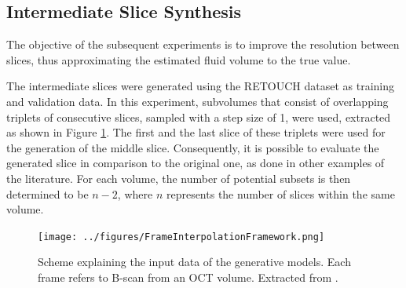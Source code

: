 \subsection{Intermediate Slice Synthesis}
The objective of the subsequent experiments is to improve the resolution between slices, thus approximating the estimated fluid volume to the true value.
\par
The intermediate slices were generated using the RETOUCH dataset as training and validation data. In this experiment, subvolumes that consist of overlapping triplets of consecutive slices, sampled with a step size of 1, were used, extracted as shown in Figure \ref{fig:FrameInterpolationFramework}. The first and the last slice of these triplets were used for the generation of the middle slice. Consequently, it is possible to evaluate the generated slice in comparison to the original one, as done in other examples of the literature. For each volume, the number of potential subsets is then determined to be $n-2$, where $n$ represents the number of slices within the same volume.

\begin{figure}[!ht]
	\centering
	\texttt{[image: ../figures/FrameInterpolationFramework.png]}
	\caption{Scheme explaining the input data of the generative models. Each frame refers to B-scan from an OCT volume. Extracted from \textcite{Tran2020}.}
	\label{fig:FrameInterpolationFramework}
\end{figure}

